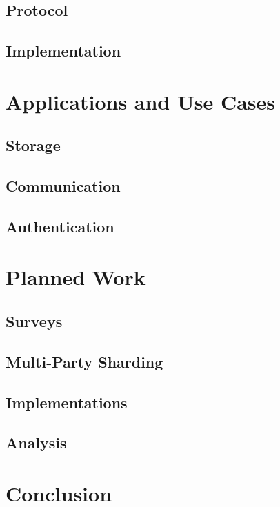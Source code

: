 \documentclass[defaultstyle,11pt]{thesis}
\begin{document}
\section{Protocol}
\section{Implementation}

%
\chapter{Applications and Use Cases}
\label{chap:apps}

\section{Storage}
\section{Communication}
\section{Authentication}

%
\chapter{Planned Work}
\label{chap:planned}

\section{Surveys}
\section{Multi-Party Sharding}
\section{Implementations}
\section{Analysis}

%
\chapter{Conclusion}
\label{chap:conclusion}


\nocite{*}                %

\appendix
%
%
\end{document}
